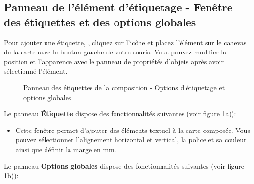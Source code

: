 \subsection{Panneau de l'élément d'étiquetage - Fenêtre des étiquettes et des options globales}

Pour ajouter une étiquette, , cliquez sur l'icône  et placez l'élément sur le canevas de la carte avec le bouton gauche de votre souris. Vous pouvez modifier la position et l'apparence avec le panneau de propriétés d'objets après avoir sélectionné l'élément.

\begin{figure}[ht]
\centering
   \hspace{1cm}
   \caption{Panneau des étiquettes de la composition - Options d'étiquetage et options globales \nixcaption}\label{fig:label_option}
\end{figure}


Le panneau \textbf{Étiquette} dispose des fonctionnalités suivantes (voir figure \ref{fig:label_option}a)):

\begin{itemize}[label=--]
\item Cette fenêtre permet d'ajouter des éléments textuel à la carte composée. Vous pouvez sélectionner l'alignement horizontal et vertical, la police et sa couleur ainsi que définir la marge en mm.
\end{itemize}


Le panneau \textbf{Options globales} dispose des fonctionnalités suivantes (voir figure \ref{fig:label_option}b)):

